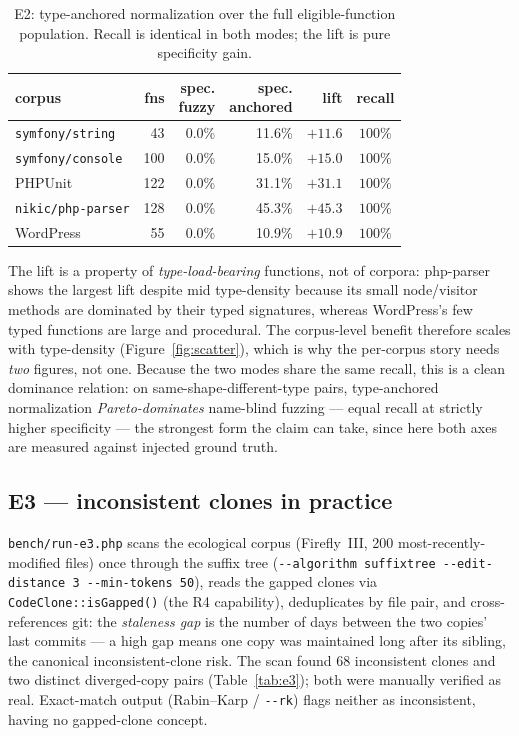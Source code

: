 \documentclass[10pt,a4paper]{article}
\newcounter{prop}[section]
\begin{document}
\begin{table}[h]
\centering
\caption{E2: type-anchored normalization over the full eligible-function population. Recall is identical in both modes;
the lift is pure specificity gain.}
\label{tab:e2}
\small
\begin{tabular}{l r r r r c}
\toprule
\textbf{corpus} & \textbf{fns} & \makecell{\textbf{spec.}\\\textbf{fuzzy}} &
\makecell{\textbf{spec.}\\\textbf{anchored}} & \textbf{lift} & \textbf{recall} \\
\midrule
\texttt{symfony/string}  &  43 & 0.0\% & 11.6\% & $+11.6$ & $100\%$ \\
\texttt{symfony/console} & 100 & 0.0\% & 15.0\% & $+15.0$ & $100\%$ \\
PHPUnit                  & 122 & 0.0\% & 31.1\% & $+31.1$ & $100\%$ \\
\texttt{nikic/php-parser}& 128 & 0.0\% & 45.3\% & $+45.3$ & $100\%$ \\
WordPress                &  55 & 0.0\% & 10.9\% & $+10.9$ & $100\%$ \\
\bottomrule
\end{tabular}
\end{table}

The lift is a property of \emph{type-load-bearing} functions, not of corpora: php-parser shows the
largest lift despite mid type-density because its small node/visitor methods are dominated by their
typed signatures, whereas WordPress's few typed functions are large and procedural. The corpus-level
benefit therefore scales with type-density (Figure~\ref{fig:scatter}), which is why the per-corpus
story needs \emph{two} figures, not one. Because the two modes share the same recall, this is a clean
dominance relation: on same-shape-different-type pairs, type-anchored normalization
\emph{Pareto-dominates} name-blind fuzzing --- equal recall at strictly higher specificity --- the
strongest form the claim can take, since here both axes are measured against injected ground truth.

\subsection{E3 --- inconsistent clones in practice}
\texttt{bench/run-e3.php} scans the ecological corpus (Firefly~III, 200 most-recently-modified files)
once through the suffix tree (\texttt{-{}-algorithm suffixtree -{}-edit-distance 3 -{}-min-tokens 50}), reads
the gapped clones via \lstinline!CodeClone::isGapped()! (the R4 capability), deduplicates by file
pair, and cross-references git: the \emph{staleness gap} is the number of days between the two copies'
last commits --- a high gap means one copy was maintained long after its sibling, the canonical
inconsistent-clone risk. The scan found 68 inconsistent clones and two distinct diverged-copy pairs
(Table~\ref{tab:e3}); both were manually verified as real. Exact-match output (Rabin--Karp /
\texttt{-{}-rk}) flags neither as inconsistent, having no gapped-clone concept.
\end{document}
